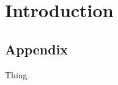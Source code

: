 \documentclass[12pt]{report}
\begin{document}
	\tableofcontents
	\listoffigures
	\listoftables
	
	
	\chapter{Introduction}
	\label{ch:introduction}
	
	
	
	\renewcommand{\bibname}{References}
	\printbibliography
	
	
	\begin{appendices}
		\chapter{Appendix}
		\label{app:appendix}
		Thing
		
	\end{appendices}
	
\end{document}
